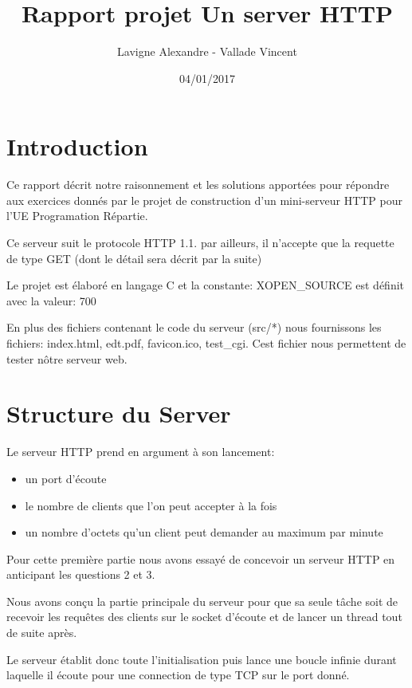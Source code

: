 \documentclass{article}
\title{Rapport projet Un server HTTP}
\author{Lavigne Alexandre - Vallade Vincent}
\date{04/01/2017}
\begin{document}
\maketitle

\section*{Introduction}

Ce rapport décrit notre raisonnement et les solutions apportées pour répondre aux exercices donnés
par le projet de construction d'un mini-serveur HTTP pour l'UE Programation Répartie.\hbox{}

Ce serveur suit le protocole HTTP 1.1. par ailleurs, il n'accepte que la requette de type GET (dont le détail sera décrit par la suite)\hbox{}

Le projet est élaboré en langage C et la constante: XOPEN\_SOURCE est définit avec la valeur: 700\hbox{}

En plus des fichiers contenant le code du serveur (src/*) nous fournissons les fichiers: index.html, edt.pdf, favicon.ico, test\_cgi. Cest fichier nous permettent de tester nôtre serveur web.

\section{Structure du Server}

Le serveur HTTP prend en argument à son lancement:
\begin{itemize}
\item un port d'écoute
\item le nombre de clients que l'on peut accepter à la fois
\item un nombre d'octets qu'un client peut demander au maximum par minute
\end{itemize}

Pour cette première partie nous avons essayé de concevoir un serveur HTTP en anticipant les questions 2 et 3.\hbox{}

Nous avons conçu la partie principale du serveur pour que sa seule tâche soit de recevoir les requêtes des clients sur le socket d'écoute et de lancer un thread tout de suite après.\hbox{}

Le serveur établit donc toute l'initialisation puis lance une boucle infinie durant laquelle il écoute pour une connection de type TCP sur le port donné.
\hbox{}
\end{document}

